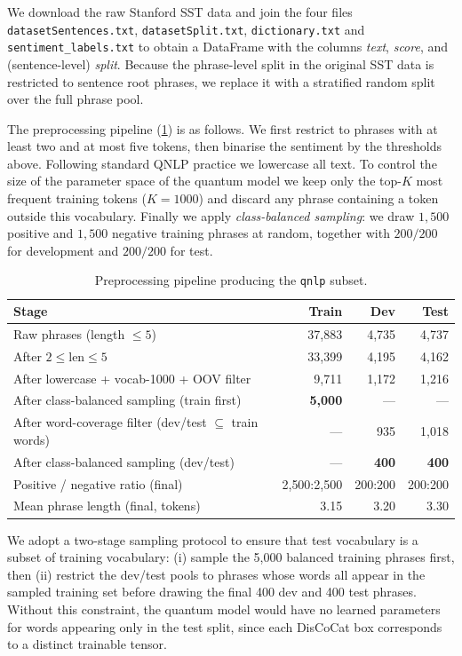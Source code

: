 \documentclass[runningheads]{llncs}
\begin{document}
We download the raw Stanford SST data and join the four files
\texttt{datasetSentences.txt}, \texttt{datasetSplit.txt},
\texttt{dictionary.txt} and \texttt{sentiment\_labels.txt} to obtain a
DataFrame with the columns \emph{text}, \emph{score}, and (sentence-level)
\emph{split}. Because the phrase-level split in the original SST data is
restricted to sentence root phrases, we replace it with a stratified
random split over the full phrase pool.

The preprocessing pipeline (\cref{tab:preproc}) is as follows. We first
restrict to phrases with at least two and at most five tokens, then binarise
the sentiment by the thresholds above. Following standard QNLP practice we
lowercase all text. To control the size of the parameter space of the
quantum model we keep only the top-\(K\) most frequent training tokens
(\(K=1000\)) and discard any phrase containing a token outside this
vocabulary. Finally we apply \emph{class-balanced sampling}: we draw
\(1{,}500\) positive and \(1{,}500\) negative training phrases at random,
together with \(200/200\) for development and \(200/200\) for test.

\begin{table}[t]
\centering
\caption{Preprocessing pipeline producing the \texttt{qnlp} subset.}
\label{tab:preproc}
\begin{tabular}{lrrr}
\toprule
Stage & Train & Dev & Test \\
\midrule
Raw phrases (length \(\leq 5\))  & 37{,}883 & 4{,}735 & 4{,}737 \\
After \(2 \leq \text{len} \leq 5\) & 33{,}399 & 4{,}195 & 4{,}162 \\
After lowercase + vocab-1000 + OOV filter & 9{,}711 & 1{,}172 & 1{,}216 \\
After class-balanced sampling (train first) & \textbf{5{,}000} & --- & --- \\
After word-coverage filter (dev/test \(\subseteq\) train words) & --- & 935 & 1{,}018 \\
After class-balanced sampling (dev/test) & --- & \textbf{400} & \textbf{400} \\
\midrule
Positive / negative ratio (final) & 2{,}500:2{,}500 & 200:200 & 200:200 \\
Mean phrase length (final, tokens) & 3.15 & 3.20 & 3.30 \\
\bottomrule
\end{tabular}
\end{table}

We adopt a two-stage sampling protocol to ensure that test vocabulary is a
subset of training vocabulary: (i) sample the 5{,}000 balanced training
phrases first, then (ii) restrict the dev/test pools to phrases whose words
all appear in the sampled training set before drawing the final 400 dev and
400 test phrases. Without this constraint, the quantum model would have no
learned parameters for words appearing only in the test split, since each
DisCoCat box corresponds to a distinct trainable tensor.
\end{document}
